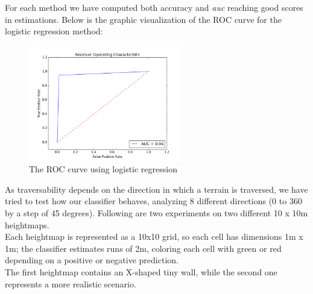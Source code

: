 \documentclass[]{usiinfbachelorproject}
\begin{document}
\noindent
For each method we have computed both accuracy and \textit{auc} reaching good scores in estimations. Below is the graphic visualization of the ROC curve for the logistic regression method:
\begin{figure} [H]
\centering
\includegraphics[width=0.6\textwidth]{roc_auc}
    \caption{The ROC curve using logistic regression}
\label{fig:roc_auc}
\end{figure}
\noindent
As traversability depends on the direction in which a terrain is traversed, we have tried to test how our classifier behaves, analyzing 8 different directions 
(0 to 360 by a step of 45 degrees). Following are two experiments on two different 10 x 10m heightmaps.\\
Each heightmap is represented as a 10x10 grid, so each cell has dimensions 1m x 1m; the classifier estimates runs of 2m, coloring each cell with green or red depending on a positive or
negative prediction.\\
The first heightmap contains an X-shaped tiny wall, while the second one represents a more realistic scenario.
\end{document}
